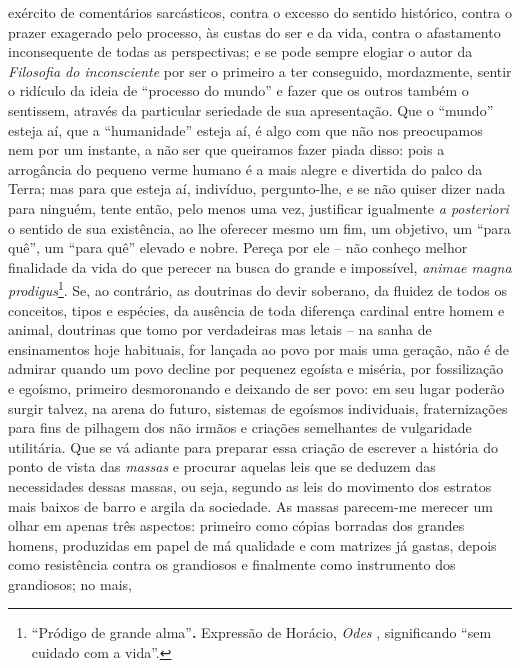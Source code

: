     exército de comentários sarcásticos, contra o excesso do sentido
    histórico, contra o prazer exagerado pelo processo, às custas do ser
    e da vida, contra o afastamento inconsequente de todas as
    perspectivas; e se pode sempre elogiar o autor da \emph{Filosofia do
    inconsciente} por ser o primeiro a ter conseguido, mordazmente,
    sentir o ridículo da ideia de ``processo do mundo'' e fazer que os
    outros também o sentissem, através da particular seriedade de sua
    apresentação. Que o ``mundo'' esteja aí, que a ``humanidade'' esteja
    aí, é algo com que não nos preocupamos nem por um instante, a não
    ser que queiramos fazer piada disso: pois a arrogância do pequeno
    verme humano é a mais alegre e divertida do palco da Terra; mas para
    que esteja aí, indivíduo, pergunto-lhe, e se não quiser dizer nada
    para ninguém, tente então, pelo menos uma vez, justificar igualmente
    \emph{a posteriori} o sentido de sua existência, ao lhe oferecer
    mesmo um fim, um objetivo, um ``para quê'', um ``para quê'' elevado
    e nobre. Pereça por ele -- não conheço melhor finalidade da vida do
    que perecer na busca do grande e impossível, \emph{animae magna
    prodigus}\footnote{``Pródigo de grande alma''\textbf{.} Expressão de
      Horácio, \emph{Odes }, significando ``sem cuidado com a vida''.}. Se, ao
    contrário, as doutrinas do devir soberano, da fluidez de todos os
    conceitos, tipos e espécies, da ausência de toda diferença cardinal
    entre homem e animal, doutrinas que tomo por verdadeiras mas letais
    -- na sanha de ensinamentos hoje habituais, for lançada ao povo por
    mais uma geração, não é de admirar quando um povo decline por
    pequenez egoísta e miséria, por fossilização e egoísmo, primeiro
    desmoronando e deixando de ser povo: em seu lugar poderão surgir
    talvez, na arena do futuro, sistemas de egoísmos individuais,
    fraternizações para fins de pilhagem dos não irmãos e criações
    semelhantes de vulgaridade utilitária. Que se vá adiante para
    preparar essa criação de escrever a história do ponto de vista das
    \emph{massas} e procurar aquelas leis que se deduzem das
    necessidades dessas massas, ou seja, segundo as leis do movimento
    dos estratos mais baixos de barro e argila da sociedade. As massas
    parecem-me merecer um olhar em apenas três aspectos: primeiro como
    cópias borradas dos grandes homens, produzidas em papel de má
    qualidade e com matrizes já gastas, depois como resistência contra
    os grandiosos e finalmente como instrumento dos grandiosos; no mais,
